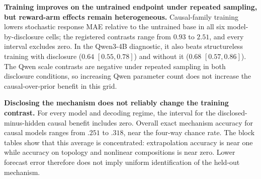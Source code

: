 \begin{center}
\begin{minipage}{\linewidth}
\centering
{}
\label{tab:exp3c-full-secondary}
\scriptsize
\setlength{\tabcolsep}{2.5pt}
\resizebox{\linewidth}{!}{%

}
\end{minipage}
\end{center}

\noindent\textbf{Training improves on the untrained endpoint under repeated
sampling, but reward-arm effects remain heterogeneous.}
Causal-family training lowers stochastic response MAE relative to the untrained
base in all six model-by-disclosure cells; the registered contrasts range from
$0.93$ to $2.51$, and every interval excludes zero. In the Qwen3-4B diagnostic,
it also beats structureless training with disclosure ($0.64$ $[0.55,0.78]$) and
without it ($0.68$ $[0.57,0.86]$). The Qwen scale contrasts are negative under
repeated sampling in both disclosure conditions, so increasing Qwen parameter
count does not increase the causal-over-prior benefit in this grid.

\noindent\textbf{Disclosing the mechanism does not reliably change the training
contrast.}
For every model and decoding regime, the interval for the disclosed-minus-hidden
causal benefit includes zero. Overall exact mechanism accuracy for causal models
ranges from $.251$ to $.318$, near the four-way chance rate. The block tables show
that this average is concentrated: extrapolation accuracy is near one while
accuracy on topology and nonlinear compositions is near zero. Lower forecast
error therefore does not imply uniform identification of the held-out mechanism.

\begin{center}
\begin{minipage}{\linewidth}
\centering
{}
\label{tab:exp3c-full-greedy-blocks}
\scriptsize
\setlength{\tabcolsep}{1.7pt}
\renewcommand{\arraystretch}{0.82}
\resizebox{\linewidth}{!}{%

}
\end{minipage}
\end{center}

